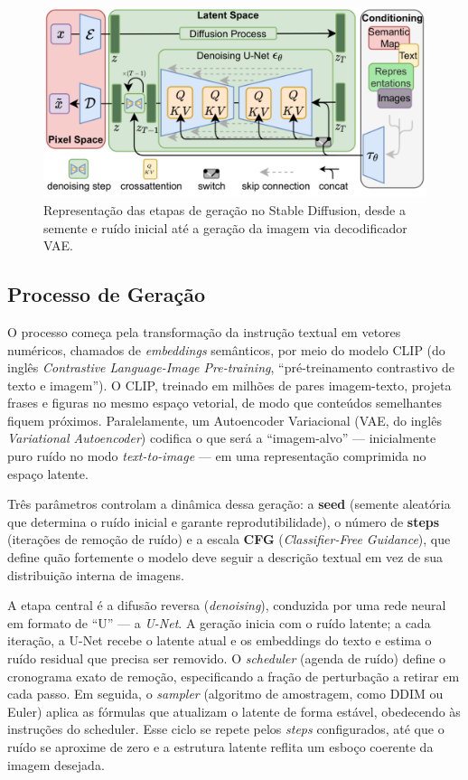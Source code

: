 \documentclass[12pt, %
openright, 
oneside, %
a4paper,    %
brazil]{facom-ufu-abntex2}
\begin{document}
\begin{figure}[H]
    \centering
	\includegraphics[width=0.9\linewidth]{sdxl-flow.png}
	\caption[Diagrama do fluxo lógico dos modelos de difusão latente]{Representação das etapas de geração no Stable Diffusion, desde a semente e ruído inicial até a geração da imagem via decodificador VAE.}
	\label{fig:diagramaFluxoStableDiffusion}
\end{figure}

\subsection{Processo de Geração}

O processo começa pela transformação da instrução textual em vetores numéricos, chamados de \emph{embeddings} semânticos, por meio do modelo CLIP (do inglês \emph{Contrastive Language-Image Pre-training}, ``pré-treinamento contrastivo de texto e imagem''). O CLIP, treinado em milhões de pares imagem-texto, projeta frases e figuras no mesmo espaço vetorial, de modo que conteúdos semelhantes fiquem próximos. Paralelamente, um Autoencoder Variacional (VAE, do inglês \emph{Variational Autoencoder}) codifica o que será a ``imagem-alvo'' — inicialmente puro ruído no modo \emph{text-to-image} — em uma representação comprimida no espaço latente.

Três parâmetros controlam a dinâmica dessa geração: a \textbf{seed} (semente aleatória que determina o ruído inicial e garante reprodutibilidade), o número de \textbf{steps} (iterações de remoção de ruído) e a escala \textbf{CFG} (\emph{Classifier-Free Guidance}), que define quão fortemente o modelo deve seguir a descrição textual em vez de sua distribuição interna de imagens.

A etapa central é a difusão reversa (\emph{denoising}), conduzida por uma rede neural em formato de ``U'' — a \emph{U-Net}. A geração inicia com o ruído latente; a cada iteração, a U-Net recebe o latente atual e os embeddings do texto e estima o ruído residual que precisa ser removido. O \emph{scheduler} (agenda de ruído) define o cronograma exato de remoção, especificando a fração de perturbação a retirar em cada passo. Em seguida, o \emph{sampler} (algoritmo de amostragem, como DDIM ou Euler) aplica as fórmulas que atualizam o latente de forma estável, obedecendo às instruções do scheduler. Esse ciclo se repete pelos \emph{steps} configurados, até que o ruído se aproxime de zero e a estrutura latente reflita um esboço coerente da imagem desejada.
\end{document}
